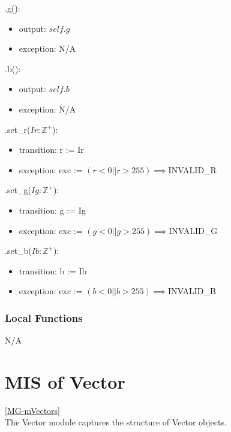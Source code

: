 \documentclass[12pt, titlepage]{article}
\begin{document}
\noindent .g():
\begin{itemize}
	\item output: $self.g$
	\item exception: N/A
\end{itemize}

\noindent .b():
\begin{itemize}
	\item output: $self.b$
	\item exception: N/A
\end{itemize} 

\noindent .set\_r($Ir: \mathbb{Z}^+$):
\begin{itemize}
	\item transition: r := Ir
	\item exception: exc := $(r < 0 || r > 255) \implies $INVALID\_R \\
\end{itemize}

\noindent .set\_g($Ig: \mathbb{Z}^+$):
\begin{itemize}
	\item transition: g := Ig
	\item exception: exc := $(g < 0 || g > 255) \implies $INVALID\_G \\
\end{itemize}

\noindent .set\_b($Ib: \mathbb{Z}^+$):
\begin{itemize}
	\item transition: b := Ib
	\item exception: exc := $(b < 0 || b > 255) \implies $INVALID\_B \\
\end{itemize}

\subsubsection{Local Functions}
N/A

\newpage

\section{MIS of Vector} \ref{MG-mVectors} \\
The Vector module captures the structure of Vector objects.
\end{document}

